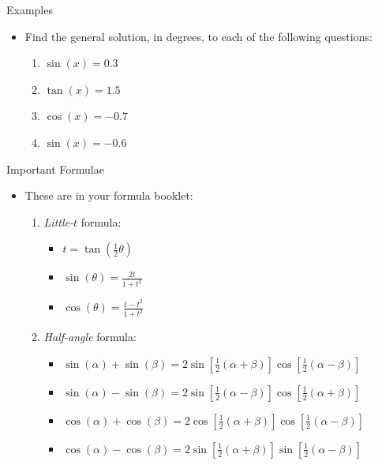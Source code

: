 \documentclass[10pt]{beamer}
\begin{document}
\begin{frame}{Examples}
	\begin{itemize}
		\item Find the general solution, in degrees, to each of the following questions:
		\begin{enumerate}
			\item $\sin(x) = 0.3$
			\item $\tan(x) = 1.5$
			\item $\cos(x) = -0.7$
			\item $\sin(x) = -0.6$
		\end{enumerate}
	\end{itemize}
\end{frame}

\begin{frame}{Important Formulae}
	\begin{itemize}
		\item These are in your formula booklet:
		\begin{enumerate}
			\item \textit{Little-$t$} formula:
				\begin{itemize}
					\item <2-> $t = \tan\left(\frac12\theta\right)$
					\item <3-> $\sin(\theta) = \frac{2t}{1+t^2}$
					\item <4-> $\cos(\theta) = \frac{1-t^2}{1+t^2}$
				\end{itemize}
			\item <5-> \textit{Half-angle} formula:
				\begin{itemize}
					\item <6-> $\sin(\alpha) + \sin(\beta) = 2\sin\left[\frac12(\alpha+\beta)\right]\cos\left[\frac12(\alpha-\beta)\right]$
					\item <7-> $\sin(\alpha) - \sin(\beta) = 2\sin\left[\frac12(\alpha-\beta)\right]\cos\left[\frac12(\alpha+\beta)\right]$
					\item <8-> $\cos(\alpha) + \cos(\beta) = 2\cos\left[\frac12(\alpha+\beta)\right]\cos\left[\frac12(\alpha-\beta)\right]$
					\item <9-> $\cos(\alpha) - \cos(\beta) = 2\sin\left[\frac12(\alpha+\beta)\right]\sin\left[\frac12(\alpha-\beta)\right]$
				\end{itemize}
		\end{enumerate}
	\end{itemize}
\end{frame}
\end{document}
